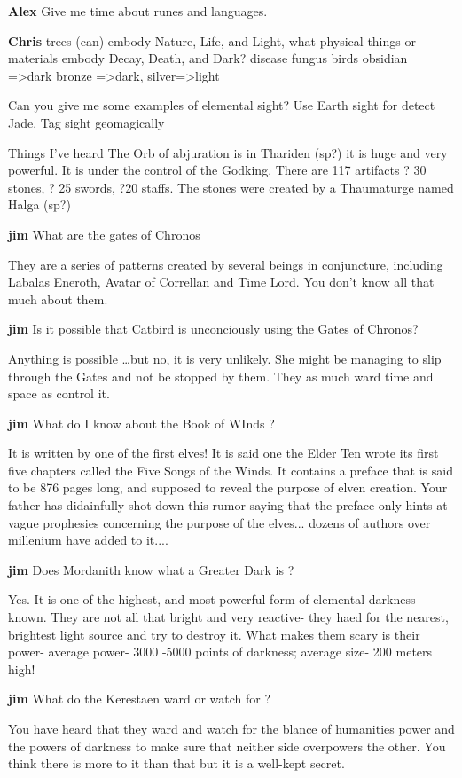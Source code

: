 {\bf Alex }
Give me time about runes and languages. 

{\bf Chris}
trees (can) embody Nature, Life, and Light, what physical things or materials
embody Decay, Death, and Dark? disease fungus birds obsidian =>dark 
bronze =>dark, silver=>light

Can you give me some examples of elemental sight? Use Earth sight for detect 
Jade. Tag sight geomagically

Things I've heard The Orb of abjuration is in Thariden (sp?) it is 
huge and  very powerful. It is under the control of the Godking. 
There are 117 artifacts ? 30 stones, ? 25 swords, ?20 staffs. The 
stones were created by a Thaumaturge  named Halga (sp?) 


{\bf jim} What are the gates of Chronos

They are a series of patterns created by several beings in 
conjuncture, including Labalas Eneroth, Avatar of Correllan and Time 
Lord.  You don't know all that much about them.

{\bf jim}
 Is it possible that Catbird is unconciously using the Gates of Chronos?

Anything is possible \dots but no, it is very unlikely.  She might be 
managing to slip through the Gates and not be stopped by them.  They 
as much ward time and space as control it.

{\bf jim}
 What do I know about the Book of WInds ?

It is written by one of the first elves!  It is said one the Elder 
Ten wrote its first five chapters called the Five Songs of the Winds. 
 It contains a preface that is said to be 876 pages long, and 
supposed to reveal the purpose of elven creation.  Your father has 
didainfully shot down this rumor saying that the preface only hints 
at vague prophesies concerning the purpose of the elves... dozens of 
authors over millenium have added to it....

{\bf jim}
Does Mordanith know what a Greater Dark is ?

Yes.  It is one of the highest, and most powerful form of 
elemental darkness known.  They are not all that bright and very reactive-
they haed for the nearest, brightest light source and try to destroy
it.  What makes them scary is their power- average power- 3000 -5000
points of darkness; average size- 200 meters high!

{\bf jim}
What do the Kerestaen ward or watch for ?

You have heard that they ward and watch for the blance of humanities 
power and the powers of darkness to make sure that neither side 
overpowers the  other.  You think there is more to it than that but 
it is a well-kept secret. 

